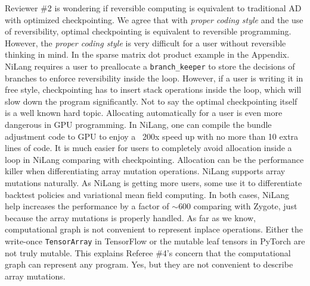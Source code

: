 \documentclass{article}
\begin{document}
Reviewer \#2 is wondering if reversible computing is equivalent to traditional AD with optimized checkpointing.
We agree that with \textit{proper coding style} and the use of reversibility, optimal checkpointing is equivalent to reversible programming.
However, the \textit{proper coding style} is very difficult for a user without reversible thinking in mind.
In the sparse matrix dot product example in the Appendix.
NiLang requires a user to preallocate a \texttt{branch\_keeper} to store the decisions of branches to enforce reversibility inside the loop.
However, if a user is writing it in free style, checkpointing has to insert stack operations inside the loop, which will slow down the program significantly.
Not to say the optimal checkpointing itself is a well known hard topic.
Allocating automatically for a user is even more dangerous in GPU programming.
In NiLang, one can compile the bundle adjustment code to GPU to enjoy a ~200x speed up with no more than 10 extra lines of code.
It is much easier for users to completely avoid allocation inside a loop in NiLang comparing with checkpointing.
Allocation can be the performance killer when differentiating array mutation operations.
NiLang supports array mutations naturally. As NiLang is getting more users, some use it to differentiate backtest policies and variational mean field computing. In both cases, NiLang help increases the performance by a factor of $\sim600$ comparing with Zygote, just because the array mutations is properly handled.
As far as we know, computational graph is not convenient to represent inplace operations.
Either the write-once \texttt{TensorArray} in TensorFlow or the mutable leaf tensors in PyTorch are not truly mutable.
This explains Referee \#4's concern that the computational graph can represent any program.
Yes, but they are not convenient to describe array mutations.

\end{document}
